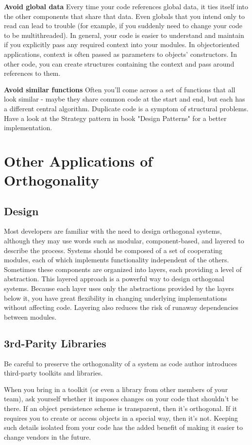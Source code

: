 \begin{item}
    \item \textbf{Avoid global data} Every time your code references global data, it ties itself into the other components that share that data. Even globals that you intend only to read can lead to trouble (for example, if you suddenly need to change your code to be multithreaded). In general, your code is easier to understand and maintain if you explicitly pass any required context into your modules. In objectoriented applications, context is often passed as parameters to objects' constructors. In other code, you can create structures containing the context and pass around references to them.
    \item \textbf{Avoid similar functions} Often you'll come across a set of functions that all look similar - maybe they share common code at the start and end, but each has a different central algorithm. Duplicate code is a symptom of structural problems. Have a look at the Strategy pattern in book "Design Patterns" for a better implementation.
\end{item}

\section{Other Applications of Orthogonality}

\subsection{Design}

Most developers are familiar with the need to design orthogonal systems, although they may use words such as modular, component-based, and layered to describe the process. Systems should be composed of a set of cooperating modules, each of which implements functionality independent of the others. Sometimes these components are organized into layers, each providing a level of abstraction. This layered approach is a powerful way to design orthogonal systems. Because each layer uses only the abstractions provided by the layers below it, you have great flexibility in changing underlying implementations without affecting code. Layering also reduces the risk of runaway dependencies between modules.

\subsection{3rd-Parity Libraries}

Be careful to preserve the orthogonality of a system as code author introduces third-party toolkits and libraries.

When you bring in a toolkit (or even a library from other members of your team), ask yourself whether it imposes changes on your code that shouldn't be there. If an object persistence scheme is transparent, then it's orthogonal. If it requires you to create or access objects in a special way, then it's not. Keeping such details isolated from your code has the added benefit of making it easier to change vendors in the future.